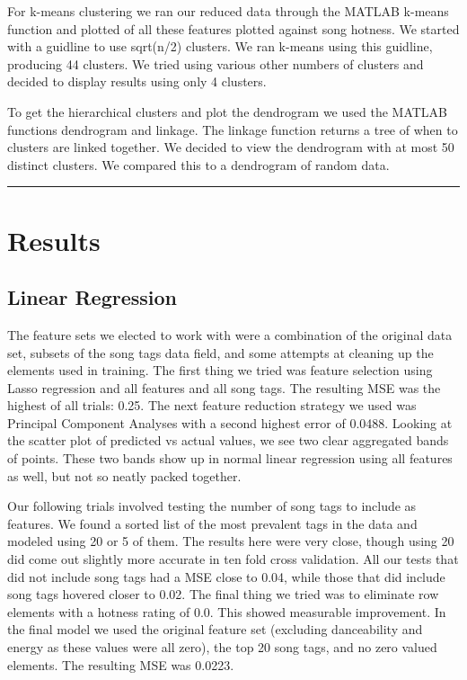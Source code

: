 \documentclass[12pt]{article}
\newcommand{\horizontalLine}{
	\begin{center}
		\hrule width 1.0\textwidth
	\end{center}
}
\begin{document}
For k-means clustering we ran our reduced data through the MATLAB k-means function and plotted of all these features plotted against song hotness. We started with a guidline to use sqrt(n/2) clusters. We ran k-means using this guidline, producing 44 clusters. We tried using various other numbers of clusters and decided to display results using only 4 clusters.

To get the hierarchical clusters and plot the dendrogram we used the MATLAB functions dendrogram and linkage. The linkage function returns a tree of when to clusters are linked together. We decided to view the dendrogram with at most 50 distinct clusters. We compared this to a dendrogram of random data.
\horizontalLine
\section{Results}
\label{sec:results}
\subsection{Linear Regression}
\label{subsec:linearRegressionResults}
The feature sets we elected to work with were a combination of the original data set, subsets of the song tags data field, and some attempts at cleaning up the elements used in training. The first thing we tried was feature selection using Lasso regression and all features and all song tags. The resulting MSE was the highest of all trials: 0.25. The next feature reduction strategy we used was Principal Component Analyses with a second highest error of 0.0488. Looking at the scatter plot of predicted vs actual values, we see two clear aggregated bands of points. These two bands show up in normal linear regression using all features as well, but not so neatly packed together.

Our following trials involved testing the number of song tags to include as features. We found a sorted list of the most prevalent tags in the data and modeled using 20 or 5 of them. The results here were very close, though using 20 did come out slightly more accurate in ten fold cross validation. All our tests that did not include song tags had a MSE close to 0.04, while those that did include song tags hovered closer to 0.02. The final thing we tried was to eliminate row elements with a hotness rating of 0.0. This showed measurable improvement. In the final model we used the original feature set (excluding danceability and energy as these values were all zero), the top 20 song tags, and no zero valued elements. The resulting MSE was 0.0223.
\end{document}
